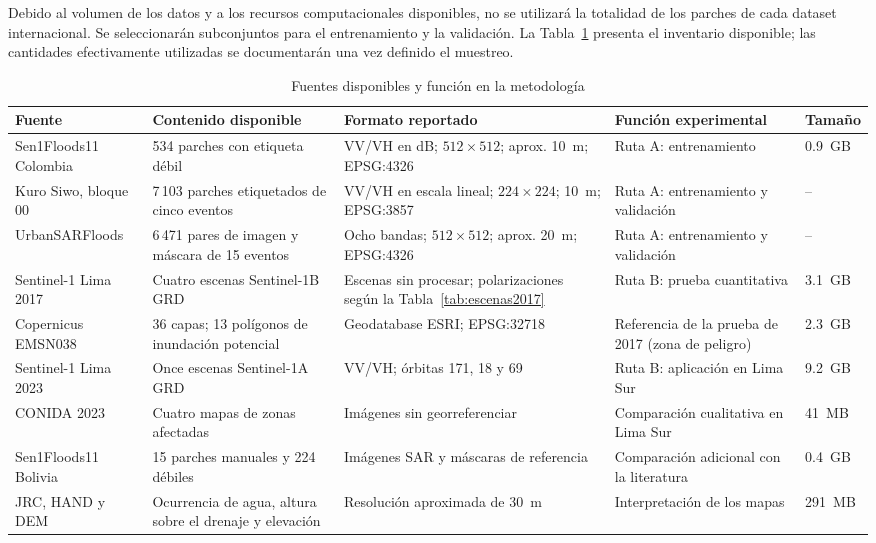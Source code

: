 \documentclass[conference]{IEEEtran}
\begin{document}
Debido al volumen de los datos y a los recursos
computacionales disponibles, no se utilizará
la totalidad de los parches de cada dataset
internacional. Se seleccionarán subconjuntos
para el entrenamiento y la validación.
La Tabla~\ref{tab:datasets} presenta el inventario
disponible; las cantidades efectivamente utilizadas
se documentarán una vez definido el muestreo.

\begin{table}[!t]
\centering
\caption{Fuentes disponibles y función en la metodología}
\label{tab:datasets}
\footnotesize
\renewcommand{\arraystretch}{1.2}
\setlength{\tabcolsep}{3pt}
\begin{tabular}{
p{}
p{}
p{}
p{}
p{}
}
\hline
\textbf{Fuente} &
\textbf{Contenido disponible} &
\textbf{Formato reportado} &
\textbf{Función experimental} &
\textbf{Tamaño} \\
\hline

Sen1Floods11 Colombia &
534 parches con etiqueta débil &
VV/VH en dB; $512\times512$;
aprox. 10~m; EPSG:4326 &
Ruta A: entrenamiento &
0.9~GB \\

Kuro Siwo, bloque 00 &
7\,103 parches etiquetados de cinco eventos &
VV/VH en escala lineal; $224\times224$;
10~m; EPSG:3857 &
Ruta A: entrenamiento y validación &
-- \\

UrbanSARFloods &
6\,471 pares de imagen y máscara de 15 eventos &
Ocho bandas; $512\times512$;
aprox. 20~m; EPSG:4326 &
Ruta A: entrenamiento y validación &
-- \\

Sentinel-1 Lima 2017 &
Cuatro escenas Sentinel-1B GRD &
Escenas sin procesar;
polarizaciones según la
Tabla~\ref{tab:escenas2017} &
Ruta B: prueba cuantitativa &
3.1~GB \\

Copernicus EMSN038 &
36 capas; 13 polígonos de inundación potencial &
Geodatabase ESRI; EPSG:32718 &
Referencia de la prueba de 2017 (zona de peligro) &
2.3~GB \\

Sentinel-1 Lima 2023 &
Once escenas Sentinel-1A GRD &
VV/VH; órbitas 171, 18 y 69 &
Ruta B: aplicación en Lima Sur &
9.2~GB \\

CONIDA 2023 &
Cuatro mapas de zonas afectadas &
Imágenes sin georreferenciar &
Comparación cualitativa en Lima Sur &
41~MB \\

Sen1Floods11 Bolivia &
15 parches manuales y 224 débiles &
Imágenes SAR y máscaras de referencia &
Comparación adicional con la literatura &
0.4~GB \\

JRC, HAND y DEM &
Ocurrencia de agua, altura sobre
el drenaje y elevación &
Resolución aproximada de 30~m &
Interpretación de los mapas &
291~MB \\

\hline
\end{tabular}
\end{table}
\end{document}
